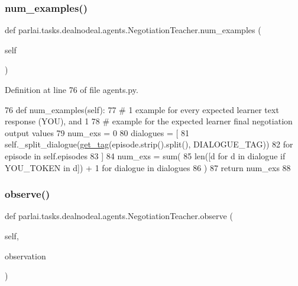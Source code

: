 \subsubsection{\texorpdfstring{num\+\_\+examples()}{num\_examples()}}
{\footnotesize\ttfamily def parlai.\+tasks.\+dealnodeal.\+agents.\+Negotiation\+Teacher.\+num\+\_\+examples (\begin{DoxyParamCaption}\item[{}]{self }\end{DoxyParamCaption})}



Definition at line 76 of file agents.\+py.


\begin{DoxyCode}
76     \textcolor{keyword}{def }num\_examples(self):
77         \textcolor{comment}{# 1 example for every expected learner text response (YOU), and 1}
78         \textcolor{comment}{# example for the expected learner final negotiation output values}
79         num\_exs = 0
80         dialogues = [
81             self.\_split\_dialogue(\hyperlink{namespaceparlai_1_1tasks_1_1dealnodeal_1_1agents_a7a1e5d8435af234bbf07491e866bb1fd}{get\_tag}(episode.strip().split(), DIALOGUE\_TAG))
82             \textcolor{keywordflow}{for} episode \textcolor{keywordflow}{in} self.episodes
83         ]
84         num\_exs = sum(
85             len([d \textcolor{keywordflow}{for} d \textcolor{keywordflow}{in} dialogue \textcolor{keywordflow}{if} YOU\_TOKEN \textcolor{keywordflow}{in} d]) + 1 \textcolor{keywordflow}{for} dialogue \textcolor{keywordflow}{in} dialogues
86         )
87         \textcolor{keywordflow}{return} num\_exs
88 
\end{DoxyCode}
\mbox{\label{classparlai_1_1tasks_1_1dealnodeal_1_1agents_1_1NegotiationTeacher_aa1a512ed945c5fc33a90005b25ef817f}} 
\subsubsection{\texorpdfstring{observe()}{observe()}}
{\footnotesize\ttfamily def parlai.\+tasks.\+dealnodeal.\+agents.\+Negotiation\+Teacher.\+observe (\begin{DoxyParamCaption}\item[{}]{self,  }\item[{}]{observation }\end{DoxyParamCaption})}

